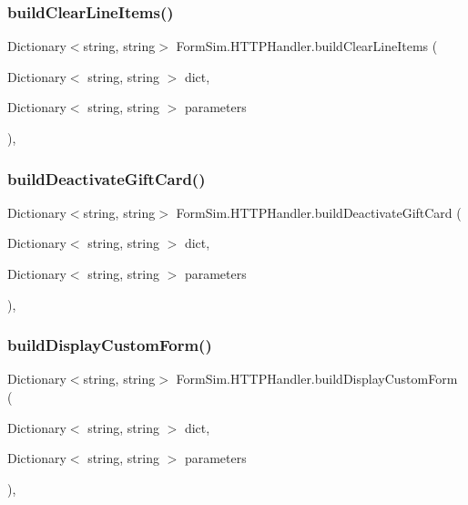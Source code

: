 \subsubsection{\texorpdfstring{build\+Clear\+Line\+Items()}{buildClearLineItems()}}
{\footnotesize\ttfamily Dictionary$<$string, string$>$ Form\+Sim.\+H\+T\+T\+P\+Handler.\+build\+Clear\+Line\+Items (\begin{DoxyParamCaption}\item[{Dictionary$<$ string, string $>$}]{dict,  }\item[{Dictionary$<$ string, string $>$}]{parameters }\end{DoxyParamCaption})\hspace{0.3cm}{\ttfamily [inline]}, {\ttfamily [private]}}

\mbox{\label{class_form_sim_1_1_h_t_t_p_handler_a4bd3c7feb6f91dc88e657a619e7c263c}} 
\subsubsection{\texorpdfstring{build\+Deactivate\+Gift\+Card()}{buildDeactivateGiftCard()}}
{\footnotesize\ttfamily Dictionary$<$string, string$>$ Form\+Sim.\+H\+T\+T\+P\+Handler.\+build\+Deactivate\+Gift\+Card (\begin{DoxyParamCaption}\item[{Dictionary$<$ string, string $>$}]{dict,  }\item[{Dictionary$<$ string, string $>$}]{parameters }\end{DoxyParamCaption})\hspace{0.3cm}{\ttfamily [inline]}, {\ttfamily [private]}}

\mbox{\label{class_form_sim_1_1_h_t_t_p_handler_a4cba54d2579ac2e2d4092e4a82c86d78}} 
\subsubsection{\texorpdfstring{build\+Display\+Custom\+Form()}{buildDisplayCustomForm()}}
{\footnotesize\ttfamily Dictionary$<$string, string$>$ Form\+Sim.\+H\+T\+T\+P\+Handler.\+build\+Display\+Custom\+Form (\begin{DoxyParamCaption}\item[{Dictionary$<$ string, string $>$}]{dict,  }\item[{Dictionary$<$ string, string $>$}]{parameters }\end{DoxyParamCaption})\hspace{0.3cm}{\ttfamily [inline]}, {\ttfamily [private]}}

